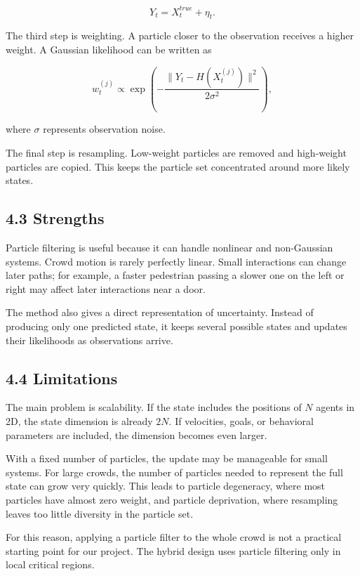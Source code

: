 \documentclass[
  11pt,
]{article}
\begin{document}
\[
Y_t = X_t^{true} + \eta_t.
\]

The third step is weighting. A particle closer to the observation
receives a higher weight. A Gaussian likelihood can be written as

\[
w_t^{(j)}
\propto
\exp\left(
-\frac{\|Y_t - H(X_t^{(j)})\|^2}{2\sigma^2}
\right),
\]

where \(\sigma\) represents observation noise.

The final step is resampling. Low-weight particles are removed and
high-weight particles are copied. This keeps the particle set
concentrated around more likely states.

\subsection{4.3 Strengths}\label{strengths}

Particle filtering is useful because it can handle nonlinear and
non-Gaussian systems. Crowd motion is rarely perfectly linear. Small
interactions can change later paths; for example, a faster pedestrian
passing a slower one on the left or right may affect later interactions
near a door.

The method also gives a direct representation of uncertainty. Instead of
producing only one predicted state, it keeps several possible states and
updates their likelihoods as observations arrive.

\subsection{4.4 Limitations}\label{limitations-1}

The main problem is scalability. If the state includes the positions of
\(N\) agents in 2D, the state dimension is already \(2N\). If
velocities, goals, or behavioral parameters are included, the dimension
becomes even larger.

With a fixed number of particles, the update may be manageable for small
systems. For large crowds, the number of particles needed to represent
the full state can grow very quickly. This leads to particle degeneracy,
where most particles have almost zero weight, and particle deprivation,
where resampling leaves too little diversity in the particle set.

For this reason, applying a particle filter to the whole crowd is not a
practical starting point for our project. The hybrid design uses
particle filtering only in local critical regions.
\end{document}
